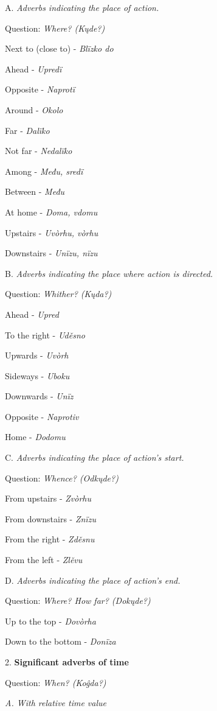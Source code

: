 A. \textit{Adverbs indicating the place of action.}

Question: \textit{Where? (Kųde?)}

Next to (close to) - \textit{Blïzko do}

Ahead - \textit{Upredï}

Opposite - \textit{Naprotï}

Around - \textit{Okolo}

Far - \textit{Dalïko}

Not far - \textit{Nedalïko}

Among - \textit{Među, sredï}

Between - \textit{Među}

At home -\textit{ Doma, vdomu}

Upstairs - \textit{Uvòrhu, vòrhu}

Downstairs - \textit{Unïzu, nïzu}

B. \textit{Adverbs indicating the place where action is directed. }

Question:\textit{ Whither? (Kųda?)}

Ahead - \textit{Upred}

To the right - \textit{Uděsno}

Upwards - \textit{Uvòrh}

Sideways - \textit{Uboku}

Downwards - \textit{Unïz}

Opposite - \textit{Naprotiv}

Home - \textit{Dodomu}

C. \textit{Adverbs indicating the place of action’s start.}

Question: \textit{Whence? (Odkųde?)}

From upstairs - \textit{Zvòrhu}

From downstairs - \textit{Znïzu}

From the right - \textit{Zděsnu}

From the left - \textit{Zlěvu}

D. \textit{Adverbs indicating the place of action’s end.}

Question: \textit{Where? How far? (Dokųde?)}

Up to the top - \textit{Dovòrha}

Down to the bottom - \textit{Donïza}

2. \textbf{Significant adverbs of time}

Question: \textit{When? (Koĝda?)}

\textit{A. With relative time value}

